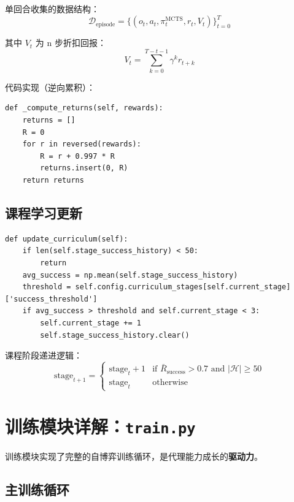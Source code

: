 \documentclass[UTF8, a4paper]{ctexart}
\begin{document}
单回合收集的数据结构：
\begin{equation}
\mathcal{D}_{\text{episode}} = \{(o_t, a_t, \pi_t^{\text{MCTS}}, r_t, V_t)\}_{t=0}^{T}
\end{equation}

其中 $V_t$ 为 n 步折扣回报：
\begin{equation}
\boxed{V_t = \sum_{k=0}^{T-t-1} \gamma^k r_{t+k}}
\end{equation}

代码实现（逆向累积）：
\begin{lstlisting}
def _compute_returns(self, rewards):
    returns = []
    R = 0
    for r in reversed(rewards):
        R = r + 0.997 * R
        returns.insert(0, R)
    return returns
\end{lstlisting}

\subsection{课程学习更新}

\begin{lstlisting}
def update_curriculum(self):
    if len(self.stage_success_history) < 50:
        return
    avg_success = np.mean(self.stage_success_history)
    threshold = self.config.curriculum_stages[self.current_stage]['success_threshold']
    if avg_success > threshold and self.current_stage < 3:
        self.current_stage += 1
        self.stage_success_history.clear()
\end{lstlisting}

课程阶段递进逻辑：
\begin{equation}
\text{stage}_{t+1} = \begin{cases}
\text{stage}_t + 1 & \text{if } \bar{R}_{\text{success}} > 0.7 \text{ and } |\mathcal{H}| \geq 50 \\
\text{stage}_t & \text{otherwise}
\end{cases}
\end{equation}

\newpage
\section{训练模块详解：\texttt{train.py}}

训练模块实现了完整的自博弈训练循环，是代理能力成长的\textbf{驱动力}。

\subsection{主训练循环}
\end{document}
